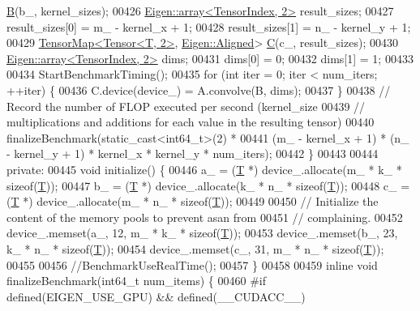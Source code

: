 \begin{DoxyCode}
      \hyperlink{group___core___module_class_eigen_1_1_matrix}{B}(b\_, kernel\_sizes);
00426     \hyperlink{class_eigen_1_1array}{Eigen::array<TensorIndex, 2>} result\_sizes;
00427     result\_sizes[0] = m\_ - kernel\_x + 1;
00428     result\_sizes[1] = n\_ - kernel\_y + 1;
00429     \hyperlink{class_eigen_1_1_tensor_map}{TensorMap<Tensor<T, 2>}, \hyperlink{group__enums_gga45fe06e29902b7a2773de05ba27b47a1ad37d4c71425bb286e9b4103830538fbf}{Eigen::Aligned}> 
      \hyperlink{group___core___module}{C}(c\_, result\_sizes);
00430     \hyperlink{class_eigen_1_1array}{Eigen::array<TensorIndex, 2>} dims;
00431     dims[0] = 0;
00432     dims[1] = 1;
00433 
00434     StartBenchmarkTiming();
00435     \textcolor{keywordflow}{for} (\textcolor{keywordtype}{int} iter = 0; iter < num\_iters; ++iter) \{
00436       C.device(device\_) = A.convolve(B, dims);
00437     \}
00438     \textcolor{comment}{// Record the number of FLOP executed per second (kernel\_size}
00439     \textcolor{comment}{// multiplications and additions for each value in the resulting tensor)}
00440     finalizeBenchmark(static\_cast<int64\_t>(2) *
00441         (m\_ - kernel\_x + 1) * (n\_ - kernel\_y + 1) * kernel\_x * kernel\_y * num\_iters);
00442   \}
00443 
00444  \textcolor{keyword}{private}:
00445   \textcolor{keywordtype}{void} initialize() \{
00446     a\_ = (\hyperlink{group___sparse_core___module}{T} *) device\_.allocate(m\_ * k\_ * \textcolor{keyword}{sizeof}(\hyperlink{group___sparse_core___module}{T}));
00447     b\_ = (\hyperlink{group___sparse_core___module}{T} *) device\_.allocate(k\_ * n\_ * \textcolor{keyword}{sizeof}(\hyperlink{group___sparse_core___module}{T}));
00448     c\_ = (\hyperlink{group___sparse_core___module}{T} *) device\_.allocate(m\_ * n\_ * \textcolor{keyword}{sizeof}(\hyperlink{group___sparse_core___module}{T}));
00449 
00450     \textcolor{comment}{// Initialize the content of the memory pools to prevent asan from}
00451     \textcolor{comment}{// complaining.}
00452     device\_.memset(a\_, 12, m\_ * k\_ * \textcolor{keyword}{sizeof}(\hyperlink{group___sparse_core___module}{T}));
00453     device\_.memset(b\_, 23, k\_ * n\_ * \textcolor{keyword}{sizeof}(\hyperlink{group___sparse_core___module}{T}));
00454     device\_.memset(c\_, 31, m\_ * n\_ * \textcolor{keyword}{sizeof}(\hyperlink{group___sparse_core___module}{T}));
00455 
00456     \textcolor{comment}{//BenchmarkUseRealTime();}
00457   \}
00458 
00459   \textcolor{keyword}{inline} \textcolor{keywordtype}{void} finalizeBenchmark(int64\_t num\_items) \{
00460 \textcolor{preprocessor}{#if defined(EIGEN\_USE\_GPU) && defined(\_\_CUDACC\_\_)}

\end{DoxyCode}
